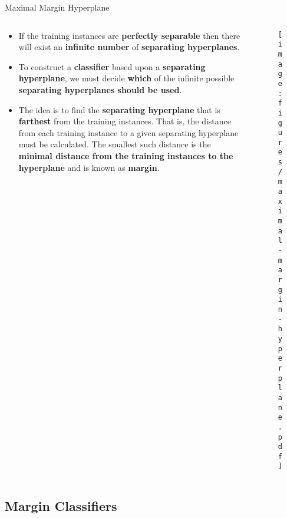 \documentclass[document.tex]{subfiles}
\begin{document}
    \begin{frame}{Maximal Margin Hyperplane}
        \begin{columns}
            \begin{column}{0.6\textwidth}
                \begin{itemize}
                    \item If the training instances are \textbf{perfectly separable} then there will exist an \textbf{infinite number} of \textbf{separating hyperplanes}.
                    \item To construct a \textbf{classifier} based upon a \textbf{separating hyperplane}, we must decide \textbf{which} of the infinite possible \textbf{separating hyperplanes should be used}.
                    \item The idea is to find the \textbf{separating hyperplane} that is \textbf{farthest} from the training instances. That is, the distance from each training instance to a given separating hyperplane must be calculated. The smallest such distance is the \textbf{minimal distance from the training instances to the hyperplane} and is known as \textbf{margin}.
                \end{itemize}
            \end{column}
            \begin{column}{0.4\textwidth}
                \begin{figure}
                    \label{fig:maximal-margin-hyperplane}
                    \texttt{[image: figures/maximal-margin-hyperplane.pdf]}
                \end{figure}
            \end{column}
        \end{columns}
    \end{frame}

    \subsection{Margin Classifiers}
\end{document}
